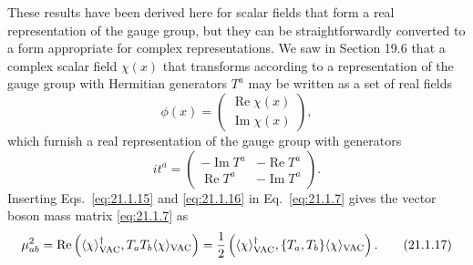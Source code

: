 These results have been derived here for scalar fields that form a real
representation of the gauge group, but they can be straightforwardly
converted to a form appropriate for complex representations. We saw in
Section 19.6 that a complex scalar field $\chi(x)$ that transforms according
to a representation of the gauge group with Hermitian generators $T^a$
may be written as a set of real fields
\begin{equation}
 \phi(x)=
 \begin{pmatrix}
  \operatorname{Re}\chi(x)\\
  \operatorname{Im}\chi(x)
 \end{pmatrix},
 \tag{21.1.15}\label{eq:21.1.15}
\end{equation}
which furnish a real representation of the gauge group with generators
\begin{equation}
 it^a=
 \begin{pmatrix}
  -\operatorname{Im}T^a&-\operatorname{Re}T^a\\
  \operatorname{Re}T^a&-\operatorname{Im}T^a
 \end{pmatrix}.
 \tag{21.1.16}\label{eq:21.1.16}
\end{equation}
Inserting Eqs.~\eqref{eq:21.1.15} and \eqref{eq:21.1.16} in
Eq.~\eqref{eq:21.1.7} gives the vector boson mass matrix
\eqref{eq:21.1.7} as
\begin{equation}
 \mu^2_{ab}
 =\operatorname{Re}\left(
 \langle\chi\rangle_{\rm VAC}^\dagger,
 T_a T_b\langle\chi\rangle_{\rm VAC}\right)
 =\frac12\left(
 \langle\chi\rangle_{\rm VAC}^\dagger,
 \{T_a,T_b\}\langle\chi\rangle_{\rm VAC}\right).
 \tag{21.1.17}\label{eq:21.1.17}
\end{equation}

